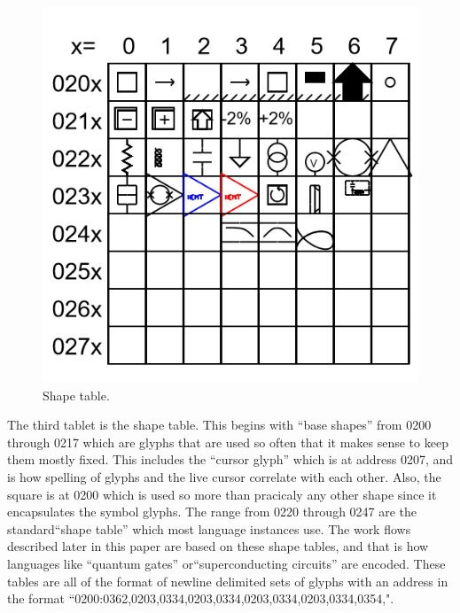 \documentclass[11pt]{article}
\begin{document}
\begin{figure}

\includegraphics[width=\linewidth]{figures/figure5_shapetable.png}

\caption{Shape table.}
\end{figure}

    The third tablet is the shape table.   This begins with ``base shapes'' from 0200 through 0217 which are glyphs that are used so often that it makes sense to keep them mostly fixed.  This includes the ``cursor glyph'' which is at address 0207, and is how spelling of glyphs and the live cursor correlate with each other.  Also, the square is at 0200 which is used so more than pracicaly any other shape since it encapsulates the symbol glyphs.  The range from 0220 through 0247 are the standard``shape table'' which most language instances use.  The work flows described later in this paper are based on these shape tables, and that is how languages like ``quantum gates'' or``superconducting circuits'' are encoded.  These tables are all of the format of newline delimited sets of glyphs with an address in the format ``0200:0362,0203,0334,0203,0334,0203,0334,0203,0334,0354,".  
\end{document}
